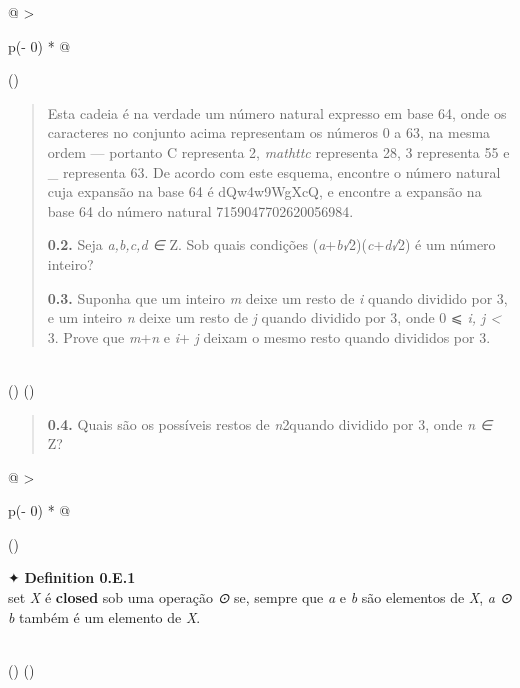 \documentclass[
]{article}
\begin{document}
\begin{longtable}[]{@{}
  >{\raggedright\arraybackslash}p{(\columnwidth - 0\tabcolsep) * }@{}}
\toprule()
\begin{minipage}[b]{\linewidth}\raggedright
\begin{quote}
Esta cadeia é na verdade um número natural expresso em base 64, onde os
caracteres no conjunto acima representam os números 0 a 63, na mesma
ordem --- portanto C representa 2, \emph{mathttc} representa 28, 3
representa 55 e \_ representa 63. De acordo com este esquema, encontre o
número natural cuja expansão na base 64 é dQw4w9WgXcQ, e encontre a
expansão na base 64 do número natural 7159047702620056984.

\textbf{0.2.} Seja \emph{a,b,c,d ∈} Z. Sob quais condições
(\emph{a}+\emph{b√}2)(\emph{c}+\emph{d√}2) é um número inteiro?

\textbf{0.3.} Suponha que um inteiro \emph{m} deixe um resto de \emph{i}
quando dividido por 3, e um inteiro \emph{n} deixe um resto de \emph{j}
quando dividido por 3, onde 0 ⩽ \emph{i, j \textless{}} 3. Prove que
\emph{m}+\emph{n} e \emph{i}+ \emph{j} deixam o mesmo resto quando
divididos por 3.
\end{quote}
\end{minipage} \\
\midrule()
\endhead
\bottomrule()
\end{longtable}

\begin{quote}
\textbf{0.4.} Quais são os possíveis restos de \emph{n}2quando dividido
por 3, onde \emph{n ∈} Z?
\end{quote}

\begin{longtable}[]{@{}
  >{\raggedright\arraybackslash}p{(\columnwidth - 0\tabcolsep) * }@{}}
\toprule()
\begin{minipage}[b]{\linewidth}\raggedright
✦ \textbf{Definition 0.E.1}\\
set \emph{X} é \textbf{closed} sob uma operação \emph{⊙} se, sempre que
\emph{a} e \emph{b} são elementos de \emph{X}, \emph{a ⊙ b} também é um
elemento de \emph{X}.\strut
\end{minipage} \\
\midrule()
\endhead
\bottomrule()
\end{longtable}
\end{document}
